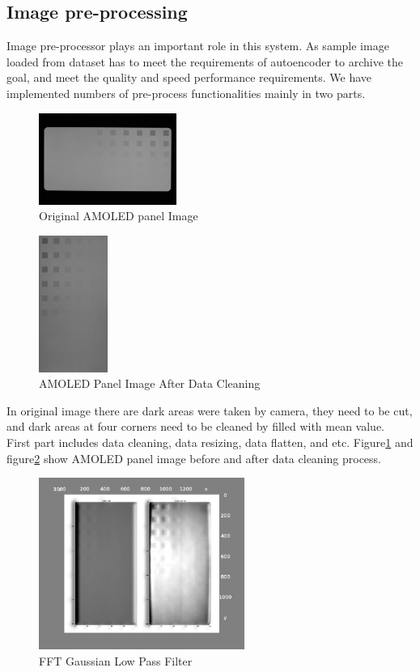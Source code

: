 \documentclass[runningheads]{llncs}
\begin{document}
\subsection{Image pre-processing}
Image pre-processor plays an important role in this system. As sample image loaded from dataset has to meet the requirements of autoencoder to archive the goal, and meet the quality and speed performance requirements.  We have implemented numbers of pre-process functionalities mainly in two parts. \\
\begin{figure}
    \centering
    \includegraphics[width=0.4\textwidth]{Pixel2-uncomp-original.jpeg}
    \caption{Original AMOLED panel Image}
    \label{fig:4}
\end{figure}
\begin{figure}
    \centering
    \includegraphics[width=0.2\textwidth, angle=270]{Pixel2-Uncomp-g.jpeg}
    \caption{AMOLED Panel Image After Data Cleaning}
    \label{fig:5}
\end{figure}
In original image there are dark areas were taken by camera, they need to be cut, and dark areas at four corners need to be cleaned by filled with mean value.\\
First part includes data cleaning, data resizing, data flatten, and etc. Figure\ref{fig:4} and figure\ref{fig:5} show AMOLED panel image before and after data cleaning process.\\
\begin{figure}
    \centering
    \includegraphics[width=0.6\textwidth]{surface_plot_fft_lowpass.png}
    \caption{FFT Gaussian Low Pass Filter}
    \label{fig:6}
\end{figure}
\end{document}
